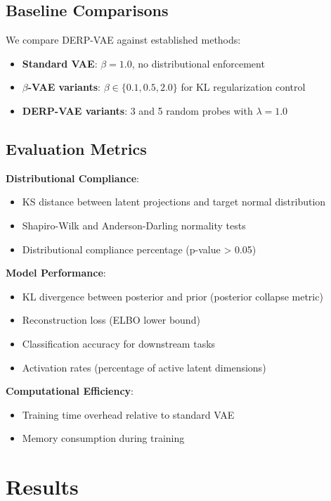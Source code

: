 \documentclass[11pt]{article}
\begin{document}
\subsection{Baseline Comparisons}

We compare DERP-VAE against established methods:

\begin{itemize}
\item \textbf{Standard VAE}: $\beta = 1.0$, no distributional enforcement
\item \textbf{$\beta$-VAE variants}: $\beta \in \{0.1, 0.5, 2.0\}$ for KL regularization control
\item \textbf{DERP-VAE variants}: 3 and 5 random probes with $\lambda = 1.0$
\end{itemize}

\subsection{Evaluation Metrics}

\textbf{Distributional Compliance}:
\begin{itemize}
\item KS distance between latent projections and target normal distribution
\item Shapiro-Wilk and Anderson-Darling normality tests
\item Distributional compliance percentage (p-value > 0.05)
\end{itemize}

\textbf{Model Performance}:
\begin{itemize}
\item KL divergence between posterior and prior (posterior collapse metric)
\item Reconstruction loss (ELBO lower bound)
\item Classification accuracy for downstream tasks
\item Activation rates (percentage of active latent dimensions)
\end{itemize}

\textbf{Computational Efficiency}:
\begin{itemize}
\item Training time overhead relative to standard VAE
\item Memory consumption during training
\end{itemize}

\section{Results}
\end{document}
